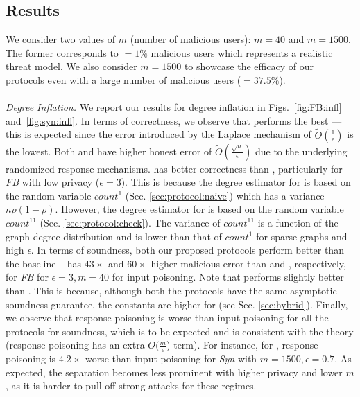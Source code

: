 \subsection{Results} \label{sec:exp-results}
 We consider two values of $m$ (number of malicious users): $m=40$ and $m=1500$. The former corresponds to $=1\%$ malicious users which represents a realistic threat model. We also consider $m=1500$ to showcase the efficacy of our protocols even with a large number of malicious users ($=37.5\%$).
\vspace{-0.2cm}\\\\\noindent\textit{Degree Inflation.} We report our results for degree inflation in Figs.~\ref{fig:FB:infl} and~\ref{fig:syn:infl}.  In terms of correctness, we observe that \DegHybrid{} performs the best --- this is expected since the error introduced by the Laplace mechanism of $\tilde{O}(\frac{1}{\epsilon})$ is the lowest. Both \DegRRCheck{} and \DegRRNaive{}  have higher honest error of $\tilde{O}(\frac{\sqrt{n}}{\epsilon})$ due to the underlying randomized response mechanisms. \DegRRCheck{} has better correctness than \DegRRNaive{}, particularly for \textit{FB} with low privacy ($\epsilon=3$). This is because the degree estimator for \DegRRNaive{} is based on the random variable $count^{1}$  (Sec. \ref{sec:protocol:naive}) which  has a variance $n\rho(1-\rho)$. However, the degree estimator for \DegRRCheck{} is based on the random variable $count^{11}$ (Sec. \ref{sec:protocol:check}). The variance of $count^{11}$ is a function of the graph degree distribution and is lower than that of $count^{1}$ for sparse graphs and high $\epsilon$. 
In terms of soundness, both our proposed protocols perform better than the baseline  -- \DegRRNaive{}  has $43\times$ and $60\times$ higher malicious error than \DegHybrid{} and \DegRRCheck, respectively, for \textit{FB} for $\epsilon=3, m=40$ for input poisoning. Note that \DegRRCheck{} performs slightly better than \DegHybrid. This is because, although both the protocols have the same asymptotic soundness guarantee, the constants are higher for \DegHybrid (see Sec. \ref{sec:hybrid}). %
Finally, we observe that response poisoning is worse than input poisoning for all the protocols for soundness, which is to be expected and is consistent with the theory (response poisoning has an extra $O(\frac{m}{\epsilon}$) term). For instance, for \DegRRCheck{}, response poisoning is $4.2\times$ worse than input poisoning for \textit{Syn} with $m=1500,\epsilon=0.7$. As expected, the separation becomes less prominent with higher privacy and lower $m$, as it is harder to pull off strong attacks for these regimes.



